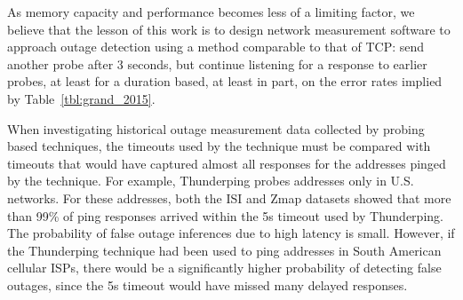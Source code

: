 As memory capacity and performance becomes less of a
limiting factor, we believe that the lesson of this work is
to design network measurement software to approach outage
detection using a method comparable to that of TCP: send
another probe after 3 seconds, but continue listening for a
response to earlier probes, at least for a duration based, at
least in part, on the error rates implied by
Table~\ref{tbl:grand_2015}. 



When investigating historical outage measurement data collected by
probing based techniques, the timeouts used by the technique must be
compared with timeouts that would have captured almost all responses
for the addresses pinged by the technique. For example, Thunderping
probes addresses only in U.S. networks. For these addresses, both the ISI
and Zmap datasets showed that more than 99\% of ping responses arrived
within the 5s timeout used by Thunderping. The probability of false
outage inferences due to high latency is small. However, if the Thunderping
technique had been used to ping addresses in South American cellular
ISPs, there would be a significantly higher probability of detecting
false outages, since the 5s timeout would have missed many delayed responses.



 

